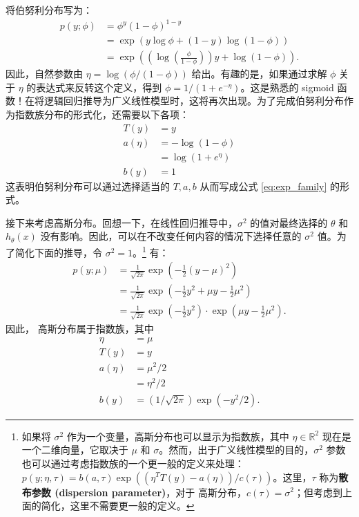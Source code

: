 将伯努利分布写为：
\[
\begin{aligned}
    p(y; \phi) &= \phi^y (1-\phi)^{1-y} \\
    &= \exp\left(y \log \phi + (1-y) \log(1-\phi)\right) \\
    &= \exp\left(\left(\log\left(\frac{\phi}{1-\phi}\right)\right)y + \log(1-\phi)\right).
\end{aligned}
\]
因此，自然参数由 $\eta = \log(\phi/(1-\phi))$ 给出。有趣的是，如果通过求解 $\phi$ 关于 $\eta$ 的表达式来反转这个定义，得到 $\phi = 1/(1+e^{-\eta})$。这是熟悉的 sigmoid 函数！在将逻辑回归推导为广义线性模型时，这将再次出现。为了完成伯努利分布作为指数族分布的形式化，还需要以下各项：
\[
\begin{aligned}
    T(y) &= y \\
    a(\eta) &= -\log(1-\phi) \\
    &= \log(1+e^\eta) \\
    b(y) &= 1
\end{aligned}
\]
这表明伯努利分布可以通过选择适当的 $T, a, b$ 从而写成公式 \eqref{eq:exp_family} 的形式。

接下来考虑高斯分布。回想一下，在线性回归推导中，$\sigma^2$ 的值对最终选择的 $\theta$ 和 $h_\theta(x)$ 没有影响。因此，可以在不改变任何内容的情况下选择任意的 $\sigma^2$ 值。为了简化下面的推导，令 $\sigma^2 = 1$。\footnote{如果将 $\sigma^2$ 作为一个变量，高斯分布也可以显示为指数族，其中 $\eta \in \mathbb{R}^2$ 现在是一个二维向量，它取决于 $\mu$ 和 $\sigma$。然而，出于广义线性模型的目的，$\sigma^2$ 参数也可以通过考虑指数族的一个更一般的定义来处理：$p(y; \eta, \tau) = b(a, \tau) \exp((\eta^T T(y) - a(\eta))/c(\tau))$。这里，$\tau$ 称为\textbf{散布参数 (dispersion parameter)}，对于 高斯分布，$c(\tau) = \sigma^2$；但考虑到上面的简化，这里不需要更一般的定义。} 有：
\[
\begin{aligned}
    p(y; \mu) &= \frac{1}{\sqrt{2\pi}} \exp\left(-\frac{1}{2}(y-\mu)^2\right) \\
    &= \frac{1}{\sqrt{2\pi}} \exp\left(-\frac{1}{2}y^2 + \mu y - \frac{1}{2}\mu^2\right) \\
    &= \frac{1}{\sqrt{2\pi}} \exp\left(-\frac{1}{2}y^2\right) \cdot \exp\left(\mu y - \frac{1}{2}\mu^2\right).
\end{aligned}
\]
因此， 高斯分布属于指数族，其中
\[
\begin{aligned}
    \eta &= \mu \\
    T(y) &= y \\
    a(\eta) &= \mu^2/2 \\
    &= \eta^2/2 \\
    b(y) &= (1/\sqrt{2\pi})\exp(-y^2/2).
\end{aligned}
\]

